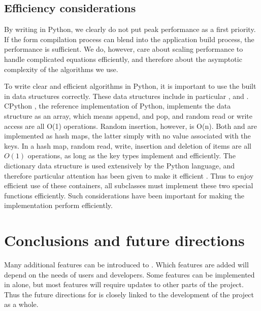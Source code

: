 \subsection{Efficiency considerations}

By writing \ufl{} in Python, we clearly do not put peak performance as
a first priority. If the form compilation process can blend into the
application build process, the performance is sufficient.  We do,
however, care about scaling performance to handle complicated
equations efficiently, and therefore about the asymptotic complexity
of the algorithms we use.

To write clear and efficient algorithms in Python, it is important to
use the built in data structures correctly.  These data structures
include in particular ,  and .
CPython \citep{Rossumothers}, the reference implementation of Python,
implements the data structure  as an array, which means
append, and pop, and random read or write access are all O(1)
operations.  Random insertion, however, is O(n).  Both 
and  are implemented as hash maps, the latter simply with
no value associated with the keys. In a hash map, random read, write,
insertion and deletion of items are all $O(1)$ operations, as long as
the key types implement  and 
efficiently. The dictionary data structure is used extensively by the Python
language, and therefore particular attention has been given to make it
efficient \citep{Kuchling2007}.  Thus to enjoy efficient use of these
containers, all  subclasses must implement these two
special functions efficiently. Such considerations have been important
for making the \ufl{} implementation perform efficiently.

\section{Conclusions and future directions} \label{ufl:sec:future}
Many additional features can be introduced to \ufl{}.
Which features are added will depend on the needs of \fenics{} users
and developers.  Some features can be implemented in \ufl{} alone,
but most features will require updates to other parts of the
\fenics{} project. Thus the future directions for \ufl{} is closely
linked to the development of the \fenics{} project as a whole.

